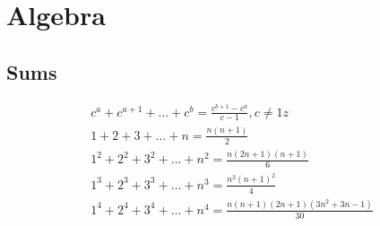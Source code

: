\section{Algebra}

\subsection{Sums}
\begin{equation}
  \begin{array}{c}
    c^a + c^{a+1} + \dots + c^{b} = \frac{c^{b+1} - c^a}{c-1}, c \neq 1 z \\
    1 + 2 + 3 + \dots + n = \frac{n(n+1)}{2} \\
    1^2 + 2^2 + 3^2 + \dots + n^2 = \frac{n(2n+1)(n+1)}{6} \\
    1^3 + 2^3 + 3^3 + \dots + n^3 = \frac{n^2(n+1)^2}{4} \\
    1^4 + 2^4 + 3^4 + \dots + n^4 = \frac{n(n+1)(2n+1)(3n^2 + 3n - 1)}{30}
  \end{array}
\end{equation}




